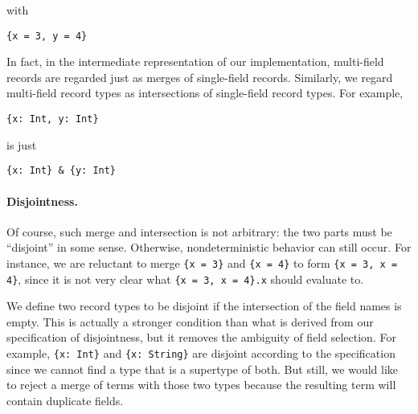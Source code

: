 \noindent with

\begin{lstlisting}
{x = 3, y = 4}
\end{lstlisting}

In fact, in the intermediate representation of our implementation, multi-field
records are regarded just as merges of single-field records. Similarly, we
regard multi-field record types as intersections of single-field record types.
For example,

\begin{lstlisting}
{x: Int, y: Int}
\end{lstlisting}

\noindent is just

\begin{lstlisting}
{x: Int} & {y: Int}
\end{lstlisting}

\paragraph{Disjointness.}

Of course, such merge and intersection is not arbitrary: the two parts must be
``disjoint'' in some sense. Otherwise, nondeterministic behavior can still
occur. For instance, we are reluctant to merge \lstinline${x = 3}$ and
\lstinline${x = 4}$ to form \lstinline${x = 3, x = 4}$, since it is not very
clear what \lstinline${x = 3, x = 4}.x$ should evaluate to.

We define two record types to be disjoint if the intersection of the field names
is empty. This is actually a stronger condition than what is derived from our
specification of disjointness, but it removes the ambiguity of field selection.
For example, \lstinline${x: Int}$ and \lstinline${x: String}$ are disjoint
according to the specification since we cannot find a type that is a supertype
of both. But still, we would like to reject a merge of terms with those two
types because the resulting term will contain duplicate fields.
